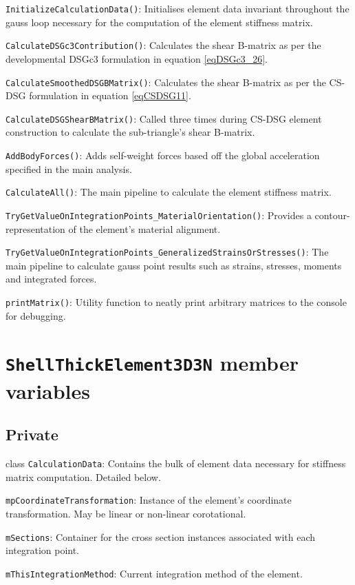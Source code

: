 \texttt{InitializeCalculationData()}: Initialises element data invariant throughout the gauss loop necessary for the computation of the element stiffness matrix.

\texttt{CalculateDSGc3Contribution()}: Calculates the shear B-matrix as per the developmental DSGc3 formulation in equation \ref{eqDSGc3_26}.

\texttt{CalculateSmoothedDSGBMatrix()}: Calculates the shear B-matrix as per the CS-DSG formulation in equation \ref{eqCSDSG11}.

\texttt{CalculateDSGShearBMatrix()}: Called three times during CS-DSG element construction to calculate the sub-triangle's shear B-matrix.

\texttt{AddBodyForces()}: Adds self-weight forces based off the global acceleration specified in the main analysis.

\texttt{CalculateAll()}: The main pipeline to calculate the element stiffness matrix.

\texttt{TryGetValueOnIntegrationPoints\_MaterialOrientation()}: Provides a contour-representation of the element's material alignment.

\texttt{TryGetValueOnIntegrationPoints\_GeneralizedStrainsOrStresses()}: The main pipeline to calculate gauss point results such as strains, stresses, moments and integrated forces.

\texttt{printMatrix()}: Utility function to neatly print arbitrary matrices to the console for debugging.

\section{\texttt{ShellThickElement3D3N} member variables}
\subsection{Private}

class \texttt{CalculationData}: Contains the bulk of element data necessary for stiffness matrix computation. Detailed below.

\texttt{mpCoordinateTransformation}: Instance of the element's coordinate transformation. May be linear or non-linear corotational.

\texttt{mSections}: Container for the cross section instances associated with each integration point.

\texttt{mThisIntegrationMethod}: Current integration method of the element.

